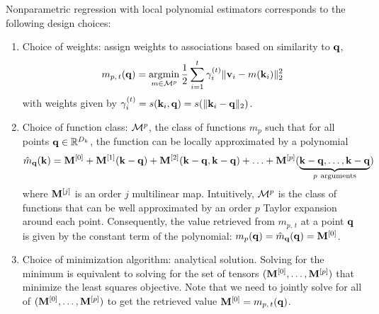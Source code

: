 \documentclass[notitlepage, 11pt]{article}
\newcommand*{\memory}{{m}}
\newcommand*{\dkey}{{D_k}}
\begin{document}
Nonparametric regression with local polynomial estimators corresponds to the following design choices:
\begin{enumerate}
    \item Choice of weights: assign weights to associations based on similarity to $\mathbf{q}$, 
    \begin{align} \memory_{p,\,t}(\qbf) = \argmin_{\memory\in \Mcal^p} \frac{1}{2}\sum_{i=1}^t \gamma_i^{(t)} \norm{\vbf_i - \memory(\kbf_i)}_2^2 \label{eqn:local-polynomial-loss}\end{align}
    with weights given by $\gamma_i^{(t)}=s(\mathbf{k}_i, \mathbf{q})=s(\lVert\mathbf{k}_i - \mathbf{q}\rVert_2)$.
    \item Choice of function class:  $\mathcal{M}^p$, the class of functions $\memory_p$ such that for all points $\qbf\in \reals^\dkey$, the function can be locally approximated by a polynomial
        \begin{align}
            \hat{\memory}_\qbf(\kbf) = \Mbf^{[0]} + \Mbf^{[1]}(\kbf- \qbf) + \Mbf^{[2]}(\kbf - \qbf, \kbf - \qbf) + \ldots + \Mbf^{[p]}(\underbrace{\kbf - \qbf, \ldots, \kbf - \qbf}_{p\ \text{arguments}})\label{eqn:multivariate-polynomial}
        \end{align}
        where $\mathbf{M}^{[j]}$ is an order $j$ multilinear map.
        Intuitively, $\mathcal{M}^p$ is the class of functions that can be well approximated by an order $p$ Taylor expansion around each point.
        Consequently, the value retrieved from $\memory_{p,\, t}$ at a point $\mathbf{q}$ is given by the constant term of the polynomial: $\memory_{p}(\qbf) = \hat\memory_\qbf(\qbf) = \Mbf^{[0]}$.
    \item Choice of minimization algorithm: analytical solution.  Solving for the minimum is equivalent to solving for the set of tensors $(\mathbf{M}^{[0]}, \ldots, \mathbf{M}^{[p]})$ that minimize the least squares objective. Note that we need to jointly solve for all of $(\mathbf{M}^{[0]}, \ldots, \mathbf{M}^{[p]})$ to get the retrieved value $\Mbf^{[0]} = \memory_{p,\, t}(\qbf)$.
\end{enumerate}
\end{document}
